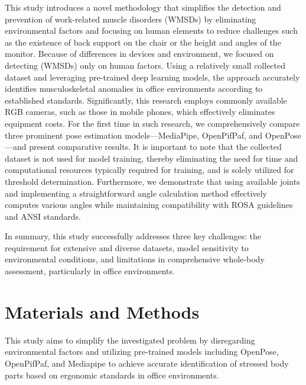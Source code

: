 \documentclass[lettersize,journal]{IEEEtran}
\begin{document}
This study introduces a novel methodology that simplifies the detection and prevention of work-related muscle disorders (WMSDs) by eliminating environmental factors and focusing on human elements to reduce challenges such as the existence of back support on the chair or the height and angles of the monitor. Because of differences in devices and environment, we focused on detecting (WMSDs) only on human factors. Using a relatively small collected dataset and leveraging pre-trained deep learning models, the approach accurately identifies musculoskeletal anomalies in office environments according to established standards. Significantly, this research employs commonly available RGB cameras, such as those in mobile phones, which effectively eliminates equipment costs. For the first time in such research, we comprehensively compare three prominent pose estimation models—MediaPipe, OpenPifPaf, and OpenPose—and present comparative results. It is important to note that the collected dataset is not used for model training, thereby eliminating the need for time and computational resources typically required for training, and is solely utilized for threshold determination. Furthermore, we demonstrate that using available joints and implementing a straightforward angle calculation method effectively computes various angles while maintaining compatibility with ROSA guidelines and ANSI standards.

In summary, this study successfully addresses three key challenges: the requirement for extensive and diverse datasets, model sensitivity to environmental conditions, and limitations in comprehensive whole-body assessment, particularly in office environments. 


\section{Materials and Methods}
This study aims to simplify the investigated problem by disregarding environmental factors and utilizing pre-trained models including OpenPose, OpenPifPaf, and Mediapipe to achieve accurate identification of stressed body parts based on ergonomic standards in office environments.
\end{document}
